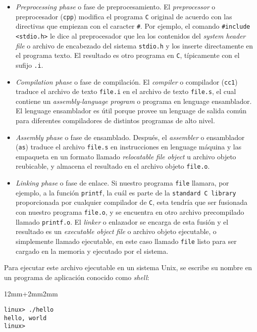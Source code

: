 \begin{itemize}
\item \textit{Preprocessing phase} o fase de preprocesamiento. El \textit{preprocessor} o preprocesador (\texttt{cpp}) modifica el programa \texttt{C} original de acuerdo con las directivas que empiezan con el caracter \texttt{\#}. Por ejemplo, el comando \texttt{\#include <stdio.h>} le dice al preprocesador que lea los contenidos del \textit{system header file} o archivo de encabezado del sistema \texttt{stdio.h} y los inserte directamente en el programa texto. El resultado es otro programa en \texttt{C}, típicamente con el sufijo \texttt{.i}. 
\item \textit{Compilation phase} o fase de compilación. El \textit{compiler} o compilador (\texttt{cc1}) traduce el archivo de texto \texttt{file.i} en el archivo de texto \texttt{file.s}, el cual contiene un \textit{assembly-language program} o programa en lenguage ensamblador. El lenguage ensamblador es útil porque provee un lenguage de salida común para diferentes compiladores de distintos programas de alto nivel. 
\item \textit{Assembly phase} o fase de ensamblado. Después, el \textit{assembler} o ensamblador (\texttt{as}) traduce el archivo \texttt{file.s} en instrucciones en lenguage máquina y las empaqueta en un formato llamado \textit{relocatable file object} u archivo objeto reubicable, y almacena el resultado en el archivo objeto \texttt{file.o}. 
\item \textit{Linking phase} o fase de enlace. Si nuestro programa \texttt{file} llamara, por ejemplo, a la función \texttt{printf}, la cuál es parte de la \texttt{standard C library} proporcionada por cualquier compilador de \texttt{C}, esta tendría que ser fusionada con nuestro programa \texttt{file.o}, y se encuentra en otro archivo precompilado llamado \texttt{printf.o}. El \textit{linker} o enlazador se encarga de esta fusión y el resultado es un \textit{executable object file} o archivo objeto ejecutable, o simplemente llamado ejecutable, en este caso llamado \texttt{file} listo para ser cargado en la memoria y ejecutado por el sistema.
\end{itemize}

Para ejecutar este archivo ejecutable en un sistema Unix, se escribe su nombre en un programa de aplicación conocido como \textit{shell}:

{
\renewcommand\ttdefault{cmtt}
\begin{adjustwidth}{12mm+2mm}{2mm}
\begin{lstlisting}
linux> ./hello
hello, world
linux>
\end{lstlisting}
\end{adjustwidth}
}

